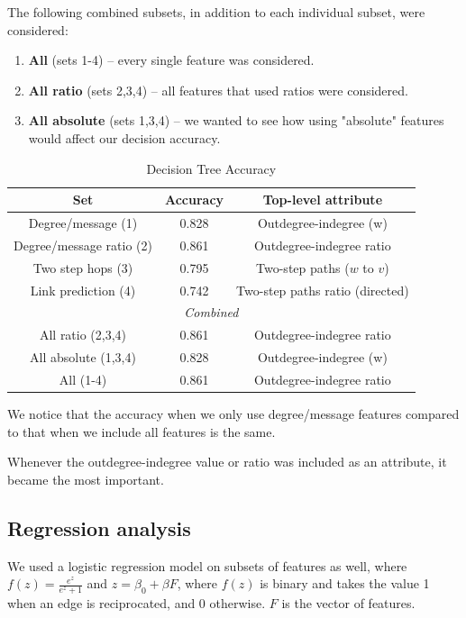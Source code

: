 \documentclass[conference]{IEEEtran}
\begin{document}
The following combined subsets, in addition to each individual subset, were considered:
\begin{enumerate}
	\item {\bf All} (sets 1-4) -- every single feature was considered.
	\item {\bf All ratio} (sets 2,3,4) -- all features that used ratios were considered.
	\item {\bf All absolute} (sets 1,3,4) -- we wanted to see how using "absolute" features would affect our decision accuracy.
\end{enumerate}
\begin{table}[!t]
\renewcommand{\arraystretch}{1.3}
\caption{Decision Tree Accuracy}
\label{table_recresults_dtree}
\centering
\begin{tabular}{|c||c|c|}
\hline
\bf{Set} & Accuracy & Top-level attribute \\
\hline
Degree/message (1) & 0.828 & Outdegree-indegree (w) \\
Degree/message ratio (2) & 0.861 & Outdegree-indegree ratio \\
Two step hops (3) & 0.795 & Two-step paths ($w$ to $v$) \\
Link prediction (4) & 0.742 & Two-step paths ratio (directed) \\
\hline
\multicolumn{3}{|c|}{\emph{Combined}} \\
\hline
All ratio (2,3,4) & 0.861 & Outdegree-indegree ratio \\
All absolute (1,3,4) & 0.828 & Outdegree-indegree (w) \\
All (1-4) & 0.861 & Outdegree-indegree ratio \\
\hline
\end{tabular}
\end{table}

We notice that the accuracy when we only use degree/message features compared to that when we include all features is the same. 

Whenever the outdegree-indegree value or ratio was included as an attribute, it became the most important.

\subsection{Regression analysis}
We used a logistic regression model on subsets of features as well, where $f(z) = \frac{e^z}{e^z+1}$ and $z = \beta_0 + \beta F$, where $f(z)$ is binary and takes the value 1 when an edge is reciprocated, and 0 otherwise. $F$ is the vector of features.
\end{document}
